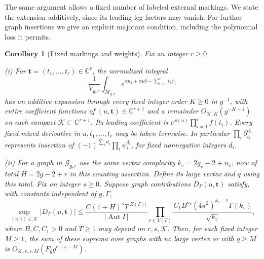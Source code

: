 \documentclass[a4paper,10pt]{article}
\numberwithin{equation}{section}
\newcommand{\MM}{\overline{\mathcal{M}}}
\theoremstyle{paperplain}
\newtheorem{crl}[thm]{Corollary}
\theoremstyle{paperremark}
\theoremstyle{paperplain}
\begin{document}
The same argument allows a fixed number of labeled external
markings. We state the extension additively, since its leading leg
factors may vanish. For further graph insertions we give an explicit
majorant condition, including the polynomial loss it permits.

\begin{crl}[Fixed markings and weights]
\label{crl:s03:marked-extension}
Fix an integer $r\geq0$.

\textup{(i)} For $\mathbf t=(t_1,\ldots,t_r)\in\mathbb C^r$,
the normalized integral
\begin{equation}
\label{eq:s03:marked-deformation}
\frac1{V_{g,r}}\int_{\MM_{g,r}}
 e^{\alpha\kappa_1+\alpha u\delta-\sum_{i=1}^rt_i\psi_i}
\end{equation}
has an additive expansion through every fixed integer order $K\geq0$
in $g^{-1}$, with
entire coefficient functions of $(u,\mathbf t)\in\mathbb C^{r+1}$
and a remainder $O_{\mathcal K,K}(g^{-K-1})$ on each compact
$\mathcal K\subset\mathbb C^{r+1}$. Its leading coefficient is
$e^{S(u)}\prod_{i=1}^rf(t_i)$.
Every fixed mixed derivative in $u,t_1,\ldots,t_r$ may be taken
termwise. In particular $\prod_i\partial_{t_i}^{d_i}$ represents
insertion of $(-1)^{\sum_i d_i}\prod_i\psi_i^{d_i}$, for fixed
nonnegative integers $d_i$.

\textup{(ii)} For a graph in $\mathcal G_{g,r}$ use the same
vertex complexity $k_v=2g_v-2+n_v$, now of total $H=2g-2+r$ in
this counting assertion. Define its large vertex and $q$ using this
total. Fix an integer $s\geq0$. Suppose graph contributions
$D_\Gamma(u,\mathbf t)$ satisfy, with constants independent of
$g,\Gamma$,
\begin{equation}
\label{eq:s03:decoration-condition}
\sup_{(u,\mathbf t)\in\mathcal K}|D_\Gamma(u,\mathbf t)|
\leq
\frac{C(1+H)^sT^{|E(\Gamma)|}}{|\operatorname{Aut}\Gamma|}
\prod_{v\in V(\Gamma)}
 \frac{C_1B^{n_v}(4\pi^2)^{k_v-1}\Gamma(k_v)}{\sqrt{k_v}},
\end{equation}
where $B,C,C_1>0$ and $T\geq1$ may depend on $r,s,\mathcal K$.
Then, for each fixed integer $M\geq1$, the sum of these suprema
over graphs with no large vertex or with $q\geq M$ is
$O_{\mathcal K,r,s,M}(F_g g^{r+s-M})$.
\end{crl}
\end{document}
